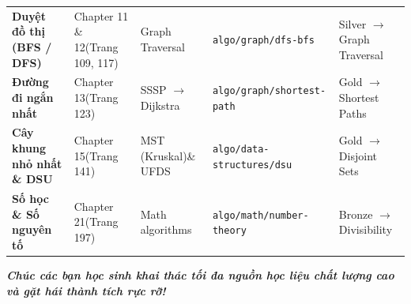 \documentclass[11pt,a4paper]{article}
\begin{document}
\begin{center}
\begin{tabular}{@{}p{3.8cm}p{3.2cm}p{3.2cm}p{3.5cm}p{3.2cm}@{}}
\addlinespace[4pt]
\textbf{Duyệt đồ thị (BFS / DFS)} & Chapter 11 \& 12\newline (Trang 109, 117) & Graph Traversal & \texttt{algo/graph/}\newline\texttt{dfs-bfs} & Silver $\to$\newline Graph Traversal \\
\addlinespace[4pt]
\textbf{Đường đi ngắn nhất} & Chapter 13\newline (Trang 123) & SSSP $\to$ Dijkstra & \texttt{algo/graph/}\newline\texttt{shortest-path} & Gold $\to$\newline Shortest Paths \\
\addlinespace[4pt]
\textbf{Cây khung nhỏ nhất \& DSU} & Chapter 15\newline (Trang 141) & MST (Kruskal)\newline \& UFDS & \texttt{algo/data-}\newline\texttt{structures/dsu} & Gold $\to$\newline Disjoint Sets \\
\addlinespace[4pt]
\textbf{Số học \& Số nguyên tố} & Chapter 21\newline (Trang 197) & Math algorithms & \texttt{algo/math/}\newline\texttt{number-theory} & Bronze $\to$\newline Divisibility \\ \bottomrule
\end{tabular}
\end{center}

\vspace{0.4cm}
\begin{center}
    \textit{\color{AsianDarkBlue}\textbf{Chúc các bạn học sinh khai thác tối đa nguồn học liệu chất lượng cao và gặt hái thành tích rực rỡ!}}
\end{center}
\end{document}
